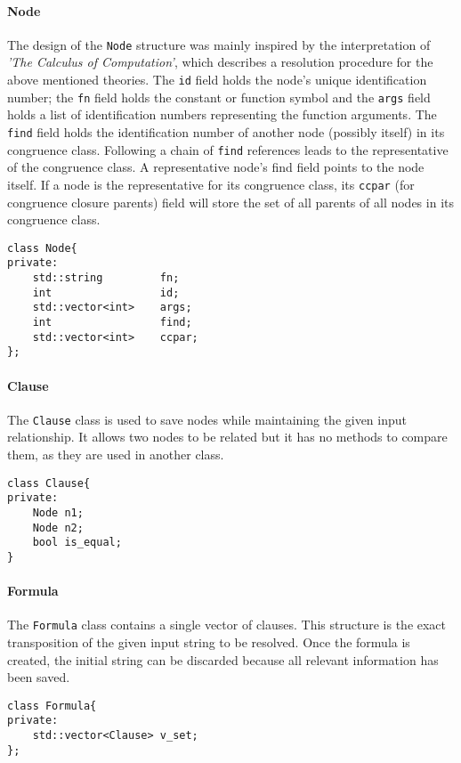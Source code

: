 \documentclass{IEEEtran}
\begin{document}
\paragraph{Node} 
The design of the \verb|Node| structure was mainly inspired by the interpretation of  \textit{'The Calculus of Computation'}\cite{10.5555/1324777}, which describes a resolution procedure for the above mentioned theories. The \verb|id| field holds the node’s unique identification number; the \verb|fn| field holds the constant or function symbol and the \verb|args| field holds a list of identification numbers representing the function arguments. The \verb|find| field holds the identification number of another node (possibly itself) in its congruence class. Following a chain of \verb|find| references leads to the representative of the congruence class. A representative node’s find field points to the node itself. If a node is the representative for its congruence class, its \verb|ccpar| (for congruence closure parents) field will store the set of all parents of all nodes in its congruence class.
\begin{lstlisting}[style=cpp]
class Node{
private:
	std::string 		fn;                  
	int			 		id;                
	std::vector<int> 	args; 
	int			 		find;              
	std::vector<int>	ccpar;
};
\end{lstlisting}
\paragraph{Clause} 
The \verb|Clause| class is used to save nodes while maintaining the given input relationship. It allows two nodes to be related but it has no methods to compare them, as they are used in another class.
\begin{lstlisting}[style=cpp]
class Clause{
private:
	Node n1;
	Node n2;
	bool is_equal;
}
\end{lstlisting}
\paragraph{Formula}
The \verb|Formula| class contains a single vector of clauses. This structure is the exact transposition of the given input string to be resolved. Once the formula is created, the initial string can be discarded because all relevant information has been saved.
\begin{lstlisting}[style=cpp]
class Formula{
private:
	std::vector<Clause> v_set;
};
\end{lstlisting}
\end{document}
